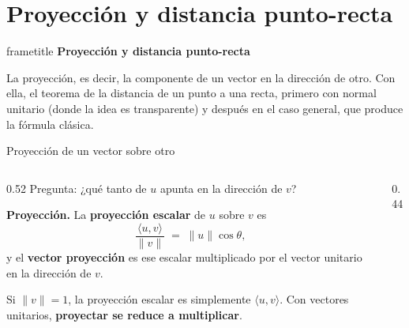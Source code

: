 \documentclass[aspectratio=169,10pt]{beamer}
\newcommand{\destaca}[1]{%
  \par\vspace{3pt}\noindent
  \colorbox{turquesaClaro}{%
    \parbox{\dimexpr\linewidth-2\fboxsep\relax}{\vspace{3pt}#1\vspace{3pt}}}%
  \par\vspace{3pt}}
\newcommand{\hojaSesion}[2]{%
  \vfill
  \begin{beamercolorbox}[wd=\textwidth,sep=16pt,center]{frametitle}
    {\Large\bfseries #1}\\[11pt]
    \begin{minipage}{0.82\textwidth}\centering\small #2\end{minipage}
  \end{beamercolorbox}
  \vfill}
\newcommand{\pp}[2]{\langle #1,#2\rangle}
\newcommand{\norma}[1]{\lVert #1\rVert}
\begin{document}
\section{Proyección y distancia punto-recta}
\begin{frame}[plain]
  \hojaSesion{Proyección y distancia punto-recta}{%
  La proyección, es decir, la componente de un vector en la dirección
  de otro. Con ella, el teorema de la distancia de un punto a una
  recta, primero con normal unitario (donde la idea es transparente)
  y después en el caso general, que produce la fórmula clásica.}
\end{frame}
\begin{frame}{Proyección de un vector sobre otro}
  \begin{columns}[T]
    \begin{column}{0.52\textwidth}
      Pregunta: ¿qué tanto de $u$ apunta en la dirección de $v$?

      \vspace{0.2cm}
      \destaca{\textbf{Proyección.} La \textbf{proyección escalar} de
      $u$ sobre $v$ es
      \[
        \frac{\pp{u}{v}}{\norma{v}}\;=\;\norma{u}\cos\theta ,
      \]
      y el \textbf{vector proyección} es ese escalar multiplicado por
      el vector unitario en la dirección de $v$.}

      \vspace{0.2cm}
      Si $\norma{v}=1$, la proyección escalar es simplemente
      $\pp{u}{v}$. Con vectores unitarios,
      \textbf{proyectar se reduce a multiplicar}.
    \end{column}
    \begin{column}{0.44\textwidth}
      \begin{center}
      \end{center}
    \end{column}
  \end{columns}
\end{frame}
\end{document}
